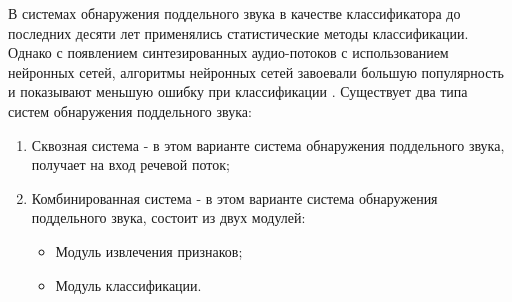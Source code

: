 В системах обнаружения поддельного звука в качестве классификатора до последних десяти лет применялись статистические методы классификации. Однако с появлением синтезированных аудио-потоков с использованием нейронных сетей, алгоритмы нейронных сетей завоевали большую популярность и показывают меньшую ошибку при классификации \cite{almutairi2022review}.
Существует два типа систем обнаружения поддельного звука:

\begin{enumerate}
    \item Сквозная система - в этом варианте система обнаружения поддельного звука, получает на вход речевой поток;
    \item Комбинированная система - в этом варианте система обнаружения поддельного звука, состоит из двух модулей: 
        \begin{itemize} 
            \item Модуль извлечения признаков;
            \item Модуль классификации.
        \end{itemize} 
\end{enumerate}






